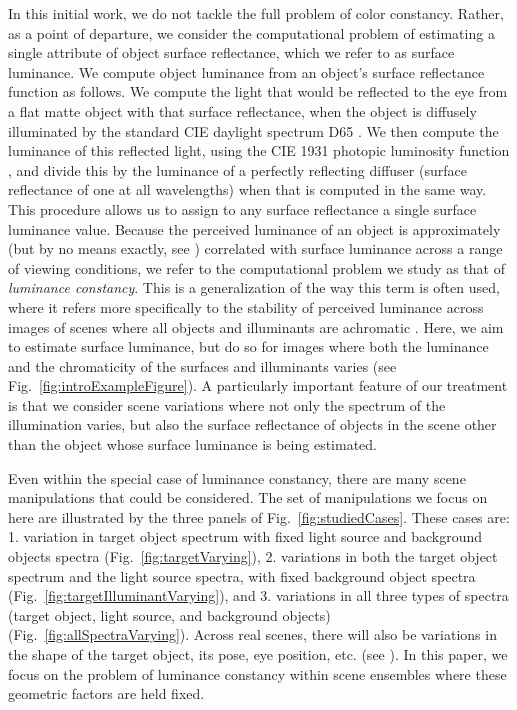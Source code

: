 \documentclass{jov}
\begin{document}
In this initial work, we do not tackle the full problem of color constancy.  Rather, as a point of departure, we consider the computational problem of estimating a single attribute of object surface reflectance, which we refer to as surface luminance.  We compute object luminance from an object's surface reflectance function as follows.  We compute the light that would be reflected to the eye from a flat matte object with that surface reflectance, when the object is diffusely illuminated by the standard CIE daylight spectrum D65 \cite{CIE86}.  We then compute the luminance of this reflected light, using the CIE 1931 photopic luminosity function \cite{CIE86}, and divide this by the luminance of a perfectly reflecting diffuser (surface reflectance of one at all wavelengths) when that is computed in the same way. This procedure allows us to assign to any surface reflectance a single surface luminance value.  Because the perceived luminance of an object is approximately (but by no means exactly, see ) correlated with surface luminance across a range of viewing conditions, we refer to the computational problem we study as that of {\em luminance constancy}.
This is a generalization of the way this term is often used, where it refers more specifically to the stability of perceived luminance across images of scenes where all objects and illuminants are achromatic \cite{gilchrist2006seeing}.
Here, we aim to estimate surface luminance, but do so for images where both the luminance and the chromaticity of the surfaces and illuminants varies (see  Fig.~\ref{fig:introExampleFigure}). A particularly important feature of our treatment is that we consider scene variations where not only the spectrum of the illumination varies, but also the surface reflectance of objects in the scene other than the object whose surface luminance is being estimated. 

Even within the special case of luminance constancy, there are many scene manipulations that could be considered. The set of manipulations we focus on here are illustrated by the three panels of Fig.~\ref{fig:studiedCases}. These cases are: 1. variation in target object spectrum with fixed light source and background objects spectra (Fig.~\ref{fig:targetVarying}), 2. variations in both the target object spectrum and the light source spectra, with fixed background object spectra (Fig.~\ref{fig:targetIlluminantVarying}), and 3. variations in all three types of spectra (target object, light source, and background objects) (Fig.~\ref{fig:allSpectraVarying}). Across real scenes, there will also be variations in the shape of the target object, its pose, eye position, etc. (see ). In this paper, we focus on the problem of luminance constancy within scene ensembles where these geometric factors are held fixed.
\end{document}
